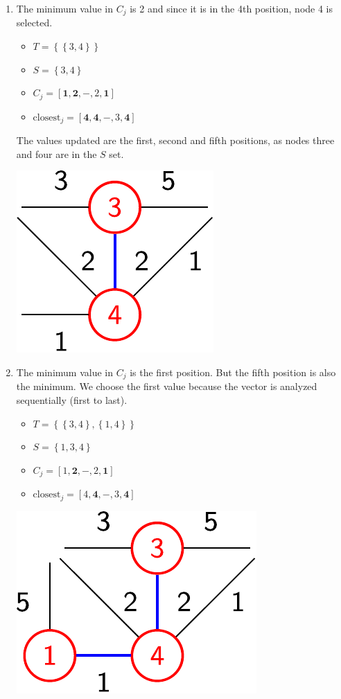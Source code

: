 \begin{examplebox}
\begin{enumerate}
        \item The minimum value in $C_{j}$ is 2 and since it is in the 4th position, node 4 is selected.
        \begin{itemize}
            \item $T = \left\{\left\{3,4\right\}\right\}$
            \item $S = \left\{3, 4\right\}$
            \item $C_{j} = \left[\mathbf{1}, \mathbf{2}, -, 2, \mathbf{1}\right]$
            \item $\text{closest}_{j} = \left[\mathbf{4}, \mathbf{4}, -, 3, \mathbf{4}\right]$
        \end{itemize}
        The values updated are the first, second and fifth positions, as nodes three and four are in the $S$ set.
        \begin{center}
            \includegraphics[width=.2\textwidth]{img/prims-alg-3-imp.pdf}
        \end{center}

        \item The minimum value in $C_{j}$ is the first position. But the fifth position is also the minimum. We choose the first value because the vector is analyzed sequentially (first to last).
        \begin{itemize}
            \item $T = \left\{\left\{3,4\right\}, \left\{1,4\right\}\right\}$
            \item $S = \left\{1, 3, 4\right\}$
            \item $C_{j} = \left[1, \mathbf{2}, -, 2, \mathbf{1}\right]$
            \item $\text{closest}_{j} = \left[4, \mathbf{4}, -, 3, \mathbf{4}\right]$
        \end{itemize}
        \begin{center}
            \includegraphics[width=.25\textwidth]{img/prims-alg-4-imp.pdf}
        \end{center}


\end{enumerate}
\end{examplebox}
